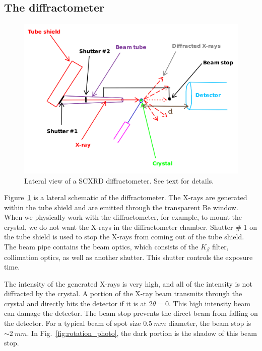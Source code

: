 \subsection{The diffractometer}

\begin{figure}
	\centering
	\includegraphics[width=\textwidth]{sc_diffractometer_lateral.png}
	\caption{\label{diffractometer_lateral}Lateral view of a SCXRD diffractometer. See text for details.}
\end{figure}

Figure~\ref{diffractometer_lateral} is a lateral schematic of the diffractometer. The X-rays are generated within the tube shield and are emitted through the transparent Be window. When we physically work with the diffractometer, for example, to mount the crystal, we do not want the X-rays in the diffractometer chamber. Shutter \# 1 on the tube shield is used to stop the X-rays from coming out of the tube shield. The beam pipe contains the beam optics, which consists of the $K_\beta$ filter, collimation optics, as well as another shutter. This shutter controls the exposure time.

The intensity of the generated X-rays is very high, and all of the intensity is not diffracted by the crystal. A portion of the X-ray beam transmits through the crystal and directly hits the detector if it is at $2\theta = 0.$ This high intensity beam can damage the detector. The beam stop prevents the direct beam from falling on the detector. For a typical beam of spot size $\SI{0.5}{mm}$ diameter, the beam stop is $\sim \SI{2}{mm}.$ In Fig.~\ref{fig:rotation_photo}, the dark portion is the shadow of this beam stop.

